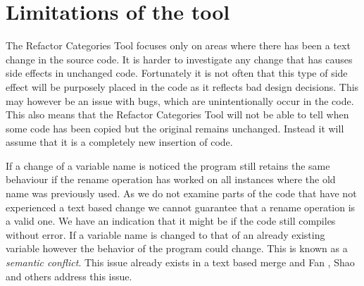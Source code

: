 
\section{Limitations of the tool}
The Refactor Categories Tool focuses only on areas where there has been a text change in the source code. 
It is harder to investigate any change that has causes side effects in unchanged code.  Fortunately it is not often that this type of side effect will be purposely placed in the code as it reflects bad design decisions.  This may however be an issue with bugs, which are unintentionally occur in the code.  
This also means that the Refactor Categories Tool will not be able to tell when some code has been copied but the original remains unchanged. Instead it will assume that it is a completely new insertion of code.

If a change of a variable name is noticed the program still retains the same behaviour if the rename operation has worked on all instances where the old name was previously used.  As we do not examine parts of the code that have not experienced a text based change we cannot guarantee that a rename operation is a valid one. We have an indication that it might be if the code still compiles without error. If a variable name is changed to that of an already existing variable however the behavior of the program could change. This is known as a \emph{semantic conflict}.  This issue already exists in a text based merge and Fan \cite{Fan2012}, Shao \cite{Shao2009} and others address this issue. 
